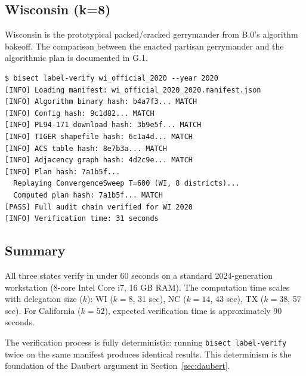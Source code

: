 \subsection{Wisconsin (k=8)}

Wisconsin is the prototypical packed/cracked gerrymander from B.0's
algorithm bakeoff.
The comparison between the enacted partisan gerrymander and the \bisect{}
algorithmic plan is documented in G.1.

\begin{lstlisting}
$ bisect label-verify wi_official_2020 --year 2020
[INFO] Loading manifest: wi_official_2020_2020.manifest.json
[INFO] Algorithm binary hash: b4a7f3... MATCH
[INFO] Config hash: 9c1d82... MATCH
[INFO] PL94-171 download hash: 3b9e5f... MATCH
[INFO] TIGER shapefile hash: 6c1a4d... MATCH
[INFO] ACS table hash: 8e7b3a... MATCH
[INFO] Adjacency graph hash: 4d2c9e... MATCH
[INFO] Plan hash: 7a1b5f...
  Replaying ConvergenceSweep T=600 (WI, 8 districts)...
  Computed plan hash: 7a1b5f... MATCH
[PASS] Full audit chain verified for WI 2020
[INFO] Verification time: 31 seconds
\end{lstlisting}

\subsection{Summary}

All three states verify in under 60 seconds on a standard 2024-generation
workstation (8-core Intel Core i7, 16 GB RAM).
The computation time scales with delegation size ($k$): WI ($k=8$, 31 sec),
NC ($k=14$, 43 sec), TX ($k=38$, 57 sec).
For California ($k=52$), expected verification time is approximately
90 seconds.

The verification process is fully deterministic: running \texttt{bisect label-verify}
twice on the same manifest produces identical results.
This determinism is the foundation of the Daubert argument in Section~\ref{sec:daubert}.
